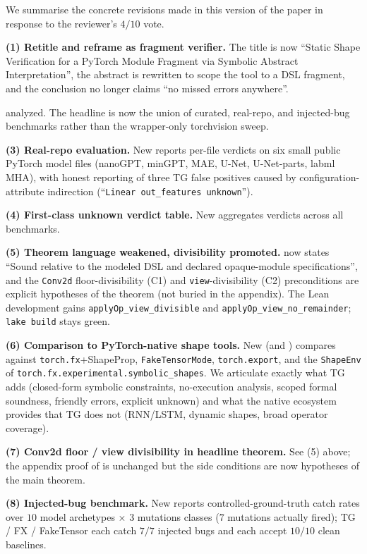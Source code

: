 \documentclass{article}
\theoremstyle{definition}
\begin{document}
We summarise the concrete revisions made in this version of the
paper in response to the reviewer's $4/10$ vote.

\textbf{(1) Retitle and reframe as fragment verifier.} The title
is now ``Static Shape Verification for a PyTorch Module Fragment
via Symbolic Abstract Interpretation'', the abstract is rewritten
to scope the tool to a DSL fragment, and the conclusion no longer
claims ``no missed errors anywhere''.

analyzed. The headline is now the union
of curated, real-repo, and injected-bug benchmarks rather than
the wrapper-only torchvision sweep.

\textbf{(3) Real-repo evaluation.} New  reports
per-file verdicts on six small public PyTorch model files
(nanoGPT, minGPT, MAE, U-Net, U-Net-parts, labml MHA), with
honest reporting of three TG false positives caused by
configuration-attribute indirection
(``\texttt{Linear out\_features unknown}'').

\textbf{(4) First-class \textsf{unknown} verdict table.} New
 aggregates verdicts across all benchmarks.

\textbf{(5) Theorem language weakened, divisibility promoted.}
 now states ``Sound relative to the modeled
DSL and declared opaque-module specifications'', and the
\verb|Conv2d| floor-divisibility (C1) and \verb|view|-divisibility
(C2) preconditions are explicit hypotheses of the theorem (not
buried in the appendix). The Lean development gains
\texttt{applyOp\_view\_divisible} and
\texttt{applyOp\_view\_no\_remainder}; \texttt{lake build} stays
green.

\textbf{(6) Comparison to PyTorch-native shape tools.} New
 (and )
compares against \verb|torch.fx|+ShapeProp, \verb|FakeTensorMode|,
\verb|torch.export|, and the \verb|ShapeEnv| of
\verb|torch.fx.experimental.symbolic_shapes|. We articulate
exactly what TG adds (closed-form symbolic constraints,
no-execution analysis, scoped formal soundness, friendly errors,
explicit \textsf{unknown}) and what the native ecosystem provides
that TG does not (RNN/LSTM, dynamic shapes, broad operator
coverage).

\textbf{(7) Conv2d floor / view divisibility in headline theorem.}
See (5) above; the appendix proof of 
is unchanged but the side conditions are now hypotheses of the
main theorem.

\textbf{(8) Injected-bug benchmark.} New 
reports controlled-ground-truth catch rates over $10$ model
archetypes $\times$ $3$ mutations classes ($7$ mutations actually
fired); TG / FX / FakeTensor each catch $7/7$ injected bugs and
each accept $10/10$ clean baselines.
\end{document}
